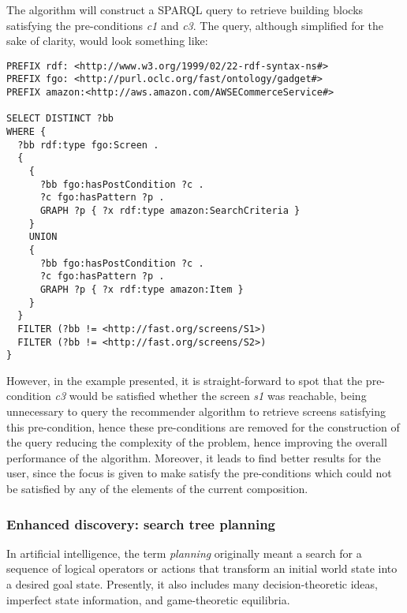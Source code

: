 The algorithm will construct a SPARQL query to retrieve building blocks satisfying the pre-conditions \emph{c1} and \emph{c3}. 
The query, although simplified for the sake of clarity, would look something like:

\begin{listing}
\begin{verbatim}
PREFIX rdf: <http://www.w3.org/1999/02/22-rdf-syntax-ns#>
PREFIX fgo: <http://purl.oclc.org/fast/ontology/gadget#>
PREFIX amazon:<http://aws.amazon.com/AWSECommerceService#>

SELECT DISTINCT ?bb 
WHERE { 
  ?bb rdf:type fgo:Screen . 
  {
    {
      ?bb fgo:hasPostCondition ?c .
      ?c fgo:hasPattern ?p .
      GRAPH ?p { ?x rdf:type amazon:SearchCriteria } 
    }
    UNION
    {
      ?bb fgo:hasPostCondition ?c .
      ?c fgo:hasPattern ?p .
      GRAPH ?p { ?x rdf:type amazon:Item } 
    }
  }
  FILTER (?bb != <http://fast.org/screens/S1>) 
  FILTER (?bb != <http://fast.org/screens/S2>) 
}
\end{verbatim}
\label{lis:sparql_find}
\end{listing}

However, in the example presented, it is straight-forward to spot that the pre-condition \emph{c3} would be
satisfied whether the screen \emph{s1} was reachable, being unnecessary to query the recommender algorithm 
to retrieve screens satisfying this pre-condition, hence these pre-conditions are removed for the construction
of the query reducing the complexity of the problem, hence improving the overall performance of the algorithm.
Moreover, it leads to find better results for the user, since the focus is given to make satisfy the 
pre-conditions which could not be satisfied by any of the elements of the current composition.

\subsubsection{Enhanced discovery: search tree planning}
\label{sssec:planning}

In artiﬁcial intelligence, the term \emph{planning} originally meant a search for a sequence of logical operators or actions
that transform an initial world state into a desired goal state. Presently, it also includes many decision-theoretic ideas,
imperfect state information, and game-theoretic equilibria.

